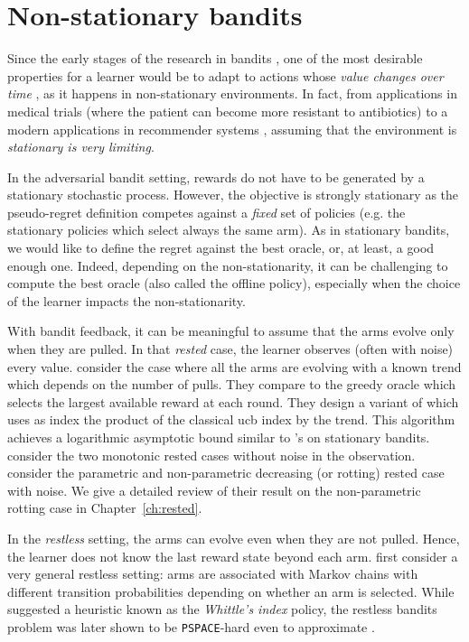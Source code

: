 {\section{Non-stationary bandits}
\label{sec:non-stationary}
Since the early stages of the research in bandits \citep{thompson1933likelihood,whittle1980multi}, one of the most desirable properties for a learner would be to adapt to actions whose \textit{value changes over time} \citep{whittle1988restless}, as it happens in non-stationary environments. In fact, from applications in medical trials (where the patient can become more resistant to antibiotics) to a modern applications in recommender systems \citep{chapelle2011empirical,traca2015regulating}, assuming that the environment is \textit{stationary is very limiting}. 

In the adversarial bandit setting, rewards do not have to be generated by a stationary stochastic process. However, the objective is strongly stationary as the pseudo-regret definition competes against a \emph{fixed} set of policies (e.g. the stationary policies which select always the same arm). As in stationary bandits, we would like to define the regret against the best oracle, or, at least, a good enough one. Indeed, depending on the non-stationarity, it can be challenging to compute the best oracle (also called the offline policy), especially when the choice of the learner impacts the non-stationarity. 

With bandit feedback, it can be meaningful to assume that the arms evolve only when they are pulled. In that \emph{rested} case, the learner observes (often with noise) every value. \citet{bouneffouf2016multi-armed} consider the case where all the arms are evolving with a known trend which depends on the number of pulls. They compare to the greedy oracle which selects the largest available reward at each round. They design a variant of \UCB which uses as index the product of the classical ucb index by the trend. This algorithm achieves a logarithmic asymptotic bound similar to \UCB's on stationary bandits. \citet{heidari2016tight} consider the two monotonic rested cases without noise in the observation. \citet{levine2017rotting} consider the parametric and non-parametric decreasing (or rotting) rested case with noise. We give a detailed review of their result on the non-parametric rotting case in Chapter~\ref{ch:rested}. 

In the \emph{restless} setting, the arms can evolve even when they are not pulled. Hence, the learner does not know the last reward state beyond each arm. \citet{whittle1988restless} first consider a very general restless setting: arms are associated with Markov chains with different transition probabilities depending on whether an arm is selected. While \citet{whittle1988restless} suggested a heuristic known as the \emph{Whittle's index} policy, the restless bandits problem was later shown to be \texttt{PSPACE}-hard even to approximate \citep{papadimitriou1994complexity}. 

}
